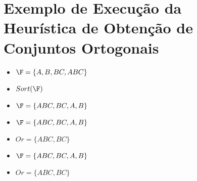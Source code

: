 \section{Exemplo de Execução da Heurística de Obtenção de Conjuntos Ortogonais}

\begin{frame}
	\begin{itemize}[<+-| alert@+>]
		\item $\F = \{A, B, BC, ABC\}$
		\item $Sort (\F)$
		\item $\F = \{ABC, BC, A, B\}$
	\end{itemize}
\end{frame}

\begin{frame}
	\begin{itemize}[<+-| alert@+>]
		\item $\F = \{ABC, BC, A, B\}$
		\item $Or = \{ABC, BC\}$
	\end{itemize}
\end{frame}

\begin{frame}
	\begin{itemize}[<+-| alert@+>]
		\item $\F = \{ABC, BC, A, B\}$
		\item $Or = \{ABC, BC\}$
	\end{itemize}
\end{frame}
